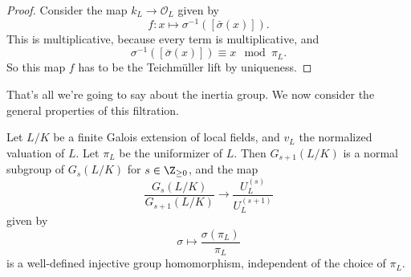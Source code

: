\documentclass[a4paper]{article}
\begin{document}
\begin{proof}
  Consider the map $k_L \to \mathcal{O}_L$ given by
  \[
    f: x \mapsto \sigma^{-1}([\bar{\sigma}(x)]).
  \]
  This is multiplicative, because every term is multiplicative, and
  \[
    \sigma^{-1}([\bar{\sigma}(x)]) \equiv x\mod \pi_L.
  \]
  So this map $f$ has to be the Teichm\"uller lift by uniqueness.
\end{proof}

That's all we're going to say about the inertia group. We now consider the general properties of this filtration.
\begin{prop}
  Let $L/K$ be a finite Galois extension of local fields, and $v_L$ the normalized valuation of $L$. Let $\pi_L$ be the uniformizer of $L$. Then $G_{s + 1}(L/K)$ is a normal subgroup of $G_s(L/K)$ for $s \in \Z_{\geq 0}$, and the map
  \[
    \frac{G_s(L/K)}{G_{s + 1}(L/K)} \to \frac{U_L^{(s)}}{U_L^{(s + 1)}}
  \]
  given by
  \[
    \sigma \mapsto \frac{\sigma(\pi_L)}{\pi_L}
  \]
  is a well-defined injective group homomorphism, independent of the choice of $\pi_L$.
\end{prop}
\end{document}
